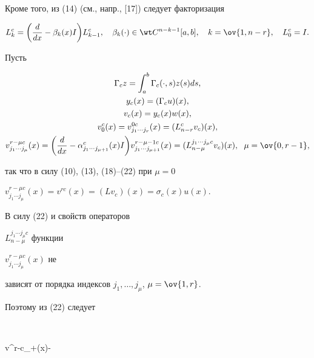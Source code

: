 Кроме того, из (14) (см., напр., [17]) следует факторизация 


\begin{equation} 


L^c_k=\bigg(\frac{d}{dx}-\beta_k(x)I\bigg) 


L^c_{k-1},\quad \beta_k(\cdot)\in \wt C^{n-k-1}[a,b], 


\quad k=\ov{1,n-r},\quad L^c_0=I. 


\end{equation} 


 


Пусть 


\begin{gather} 


\Gamma_c z=\int^b_a\Gamma_c(\cdot,s)z(s)ds, \\ 


y_c(x)=(\Gamma_c u)(x),\\ 


v_c(x)=y_c(x)w(x), \\ 


v^c_0(x)=v^{0c}_{j_1\dotsb j_r}(x)=(L^c_{n-r}v_c)(x), \\ 


v^{r-\mu c}_{j_1\dotsb j_\mu}(x)=\bigg( 


\frac{d}{dx}-\alpha^c_{j_1\dotsb j_{\mu+1}}(x)I\bigg) 


v^{r-\mu-1c}_{j_1\dotsb j_{\mu+1}}(x)= 


(L^{j_1\dotsb j_\mu c}_{n-\mu}v_c)(x), 


\ \; \mu=\ov{0,r-1}, 


\end{gather} 


так что в силу (10), (13), (18)--(22) при $\mu=0$\; 


$v^{r-\mu c}_{j_1\dotsb j_\mu}(x)=v^{r c}(x)=(L v_c)(x)=\sigma_c(x) 


u(x)$. 


 


В силу (22) и свойств операторов 


$L^{j_1\dotsb j_\mu c}_{n-\mu}$ функции 


$v^{r-\mu c}_{j_1\dotsb j_\mu}(x)$ не 


зависят от порядка индексов $j_1,\dotsc,j_\mu$, $\mu=\ov{1,r}$. 


Поэтому из (22) следует 


$$ 


v^{r-\mu c}_{\nu\dotsb\nu+}(x)- 



